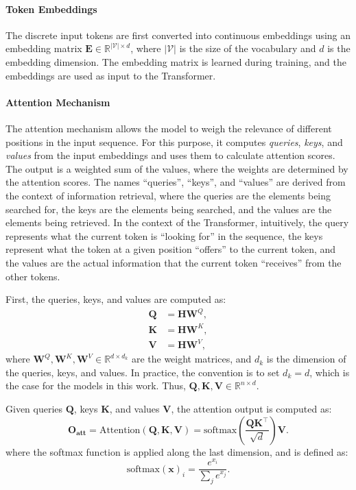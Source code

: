 \paragraph{Token Embeddings}
The discrete input tokens are first converted into continuous embeddings using an embedding matrix $\mathbf{E} \in \mathbb{R}^{|\mathcal{V}| \times d}$, where $|\mathcal{V}|$ is the size of the vocabulary and $d$ is the embedding dimension. The embedding matrix is learned during training, and the embeddings are used as input to the Transformer.

\paragraph{Attention Mechanism}
The attention mechanism \parencite{bahdanau_neural_2014} allows the model to weigh the relevance of different positions in the input sequence. For this purpose, it computes \emph{queries}, \emph{keys}, and \emph{values} from the input embeddings and uses them to calculate attention scores. The output is a weighted sum of the values, where the weights are determined by the attention scores. The names ``queries'', ``keys'', and ``values'' are derived from the context of information retrieval, where the queries are the elements being searched for, the keys are the elements being searched, and the values are the elements being retrieved. In the context of the Transformer, intuitively, the query represents what the current token is ``looking for'' in the sequence, the keys represent what the token at a given position ``offers'' to the current token, and the values are the actual information that the current token ``receives'' from the other tokens.

First, the queries, keys, and values are computed as:
\begin{align*}
    \mathbf{Q} & = \mathbf{H} \mathbf{W}^Q, \\
    \mathbf{K} & = \mathbf{H} \mathbf{W}^K, \\
    \mathbf{V} & = \mathbf{H} \mathbf{W}^V,
\end{align*}
where $\mathbf{W}^Q, \mathbf{W}^K, \mathbf{W}^V \in \mathbb{R}^{d \times d_k}$ are the weight matrices, and $d_k$ is the dimension of the queries, keys, and values. In practice, the convention is to set $d_k = d$, which is the case for the models in this work. Thus, $\mathbf{Q}, \mathbf{K}, \mathbf{V} \in \mathbb{R}^{n \times d}$.

Given queries $\mathbf{Q}$, keys $\mathbf{K}$, and values $\mathbf{V}$, the attention output is computed as:
\begin{equation*}
    \mathbf{O_{att}} = \text{Attention}(\mathbf{Q}, \mathbf{K}, \mathbf{V}) = \text{softmax}\left( \frac{\mathbf{Q} \mathbf{K}^\top}{\sqrt{d}} \right) \mathbf{V}.
\end{equation*}
where the softmax function is applied along the last dimension, and is defined as:
\begin{equation*}
    \text{softmax}(\mathbf{x})_i = \frac{e^{x_i}}{\sum_j e^{x_j}}.
\end{equation*}

